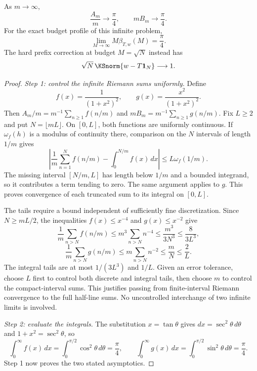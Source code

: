 \begin{KStheorem}\label{KS:WR11}
As $m\to\infty$,
\[
 \frac{A_m}{m}\longrightarrow\frac\pi4,\qquad
 mB_m\longrightarrow\frac\pi4.
\]
For the exact budget profile of this infinite problem,
\begin{equation}\label{KS:eq:sharp-budget}
 \lim_{M\to\infty}M\beta_{T,w}(M)=\frac\pi4.
\end{equation}
The hard prefix correction at budget $M=\sqrt N$ instead has
\[
 \sqrt N\,\KSnorm{w-T\mathbf1_N}\longrightarrow1.
\]
\end{KStheorem}
\begin{proof}
\emph{Step 1: control the infinite Riemann sums uniformly.} Define
\[
 f(x)=\frac1{(1+x^2)^2},\qquad
 g(x)=\frac{x^2}{(1+x^2)^2}.
\]
Then $A_m/m=m^{-1}\sum_{n\ge1}f(n/m)$ and $mB_m=m^{-1}\sum_{n\ge1}g(n/m)$. Fix $L\ge2$ and put $N=\lfloor mL\rfloor$. On $[0,L]$, both functions are uniformly continuous. If $\omega_f(h)$ is a modulus of continuity there, comparison on the $N$ intervals of length $1/m$ gives
\[
 \left|\frac1m\sum_{n=1}^N f(n/m)-\int_0^{N/m}f(x)\,dx\right|
 \le L\omega_f(1/m).
\]
The missing interval $[N/m,L]$ has length below $1/m$ and a bounded integrand, so it contributes a term tending to zero. The same argument applies to $g$. This proves convergence of each truncated sum to its integral on $[0,L]$.

The tails require a bound independent of sufficiently fine discretization. Since $N\ge mL/2$, the inequalities $f(x)\le x^{-4}$ and $g(x)\le x^{-2}$ give
\[
 \frac1m\sum_{n>N}f(n/m)
 \le m^3\sum_{n>N}n^{-4}\le\frac{m^3}{3N^3}
 \le\frac8{3L^3},
\]
\[
 \frac1m\sum_{n>N}g(n/m)
 \le m\sum_{n>N}n^{-2}\le\frac mN\le\frac2L.
\]
The integral tails are at most $1/(3L^3)$ and $1/L$. Given an error tolerance, choose $L$ first to control both discrete and integral tails, then choose $m$ to control the compact-interval sums. This justifies passing from finite-interval Riemann convergence to the full half-line sums. No uncontrolled interchange of two infinite limits is involved.

\emph{Step 2: evaluate the integrals.} The substitution $x=\tan\theta$ gives $dx=\sec^2\theta\,d\theta$ and $1+x^2=\sec^2\theta$, so
\[
 \int_0^\infty f(x)\,dx=\int_0^{\pi/2}\cos^2\theta\,d\theta=\frac\pi4,
 \qquad
 \int_0^\infty g(x)\,dx=\int_0^{\pi/2}\sin^2\theta\,d\theta=\frac\pi4.
\]
Step 1 now proves the two stated asymptotics.


\end{proof}
